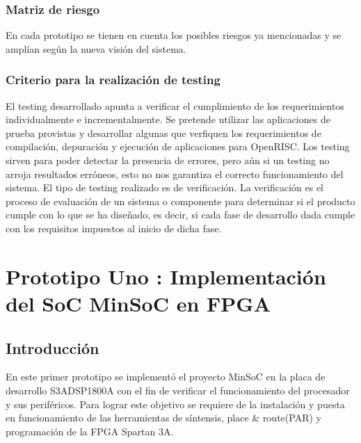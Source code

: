 		\subsection{Matriz de riesgo}
En cada prototipo se tienen en cuenta los posibles riesgos ya mencionadas y se amplían según la nueva visión del sistema.
		
		\subsection{Criterio para la realización de testing}%
		El testing desarrollado apunta a verificar el cumplimiento de los requerimientos individualmente e incrementalmente. Se pretende utilizar las
		aplicaciones de prueba provistas y desarrollar algunas que verfiquen los requerimientos de compilación, depuración y ejecución de aplicaciones para
		OpenRISC. 
		Los testing sirven para poder detectar la presencia de errores, pero aún si un testing no arroja resultados erróneos, esto no nos garantiza el
		correcto funcionamiento del sistema. El tipo de testing realizado es de verificación. La verificación es el proceso de evaluación de un sistema o
		componente para determinar si el producto cumple con lo que se ha diseñado, es decir, si cada fase de desarrollo dada cumple con los requisitos
		impuestos al inicio de dicha fase.

\newpage
\chapter{Prototipo Uno : Implementación del SoC MinSoC en FPGA}

	\section{Introducción}
		
	En este primer prototipo se implementó el proyecto MinSoC en la placa de desarrollo S3ADSP1800A con el fin de verificar el funcionamiento del procesador y sus periféricos. Para lograr este objetivo se requiere de la instalación y puesta en funcionamiento de las herramientas de síntensis, place \& route(PAR) y programación de la FPGA Spartan 3A. 

